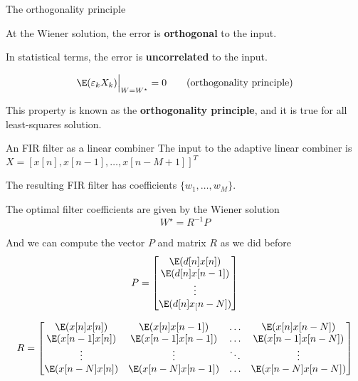 \documentclass[10pt, aspectratio=169]{beamer}
\begin{document}
\begin{frame}{The orthogonality principle}
	
	At the Wiener solution, the error is \textbf{orthogonal} to the input.
	
	In statistical terms, the error is \textbf{uncorrelated} to the input.
	
	\begin{equation}
		\E(\varepsilon_kX_k)\Big|_{W = W^\star} = 0 \tag{orthogonality principle}
	\end{equation}
	
	This property is known as the \textbf{orthogonality principle}, and it is true for all least-squares solution.
	
\end{frame}

\begin{frame}{An FIR filter as a linear combiner}
The input to the adaptive linear combiner is $X = [x[n], x[n-1], \ldots, x[n-M+1]]^T$

\begin{center}
	\resizebox{0.8\textwidth}{!}{}
\end{center}

The resulting FIR filter has coefficients $\{w_1, \ldots, w_M\}$.

\end{frame}

\begin{frame}

The optimal filter coefficients are given by the Wiener solution
\begin{equation*}
	W^{\star} = R^{-1}P
\end{equation*}

And we can compute the vector $P$ and matrix $R$ as we did before
\begin{equation*}
	P = \begin{bmatrix}
		\E(d[n]x[n]) \\
		\E(d[n]x[n-1]) \\
		\vdots \\
		\E(d[n]x_[n-N])
	\end{bmatrix} 
\end{equation*}

\begin{equation*}
	R = \begin{bmatrix}
		\E(x[n]x[n]) & \E(x[n]x[n-1]) & \ldots & \E(x[n]x[n-N]) \\
		\E(x[n-1]x[n]) & \E(x[n-1]x[n-1]) & \ldots & \E(x[n-1]x[n-N]) \\
		\vdots & \vdots & \ddots & \vdots \\
		\E(x[n-N]x[n]) & \E(x[n-N]x[n-1]) & \ldots & \E(x[n-N]x[n-N]) \\
	\end{bmatrix} 
\end{equation*}
\end{frame}
\end{document}
